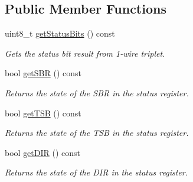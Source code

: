 \subsection*{Public Member Functions}
\begin{DoxyCompactItemize}
\item 
\mbox{\label{class_d_s24821_wire_triplet_add828cd5c41a8052bd1f004167f45856}} 
uint8\+\_\+t \mbox{\hyperlink{class_d_s24821_wire_triplet_add828cd5c41a8052bd1f004167f45856}{get\+Status\+Bits}} () const
\begin{DoxyCompactList}\small\item\em Gets the status bit result from 1-\/wire triplet. \end{DoxyCompactList}\item 
\mbox{\label{class_d_s24821_wire_triplet_a904b22b4d426bc6eab5e29812f62d326}} 
bool \mbox{\hyperlink{class_d_s24821_wire_triplet_a904b22b4d426bc6eab5e29812f62d326}{get\+S\+BR}} () const
\begin{DoxyCompactList}\small\item\em Returns the state of the S\+BR in the status register. \end{DoxyCompactList}\item 
\mbox{\label{class_d_s24821_wire_triplet_a564c45067d9502575ebcad4d7f0fe59b}} 
bool \mbox{\hyperlink{class_d_s24821_wire_triplet_a564c45067d9502575ebcad4d7f0fe59b}{get\+T\+SB}} () const
\begin{DoxyCompactList}\small\item\em Returns the state of the T\+SB in the status register. \end{DoxyCompactList}\item 
\mbox{\label{class_d_s24821_wire_triplet_afa065b80fd93597f05b2008b791e0325}} 
bool \mbox{\hyperlink{class_d_s24821_wire_triplet_afa065b80fd93597f05b2008b791e0325}{get\+D\+IR}} () const
\begin{DoxyCompactList}\small\item\em Returns the state of the D\+IR in the status register. \end{DoxyCompactList}\end{DoxyCompactItemize}
